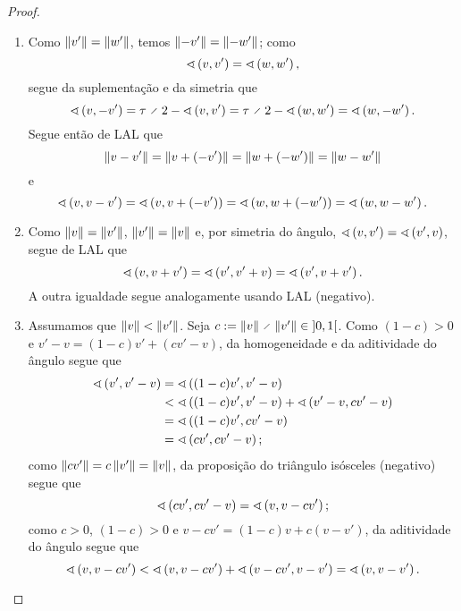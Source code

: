 \begin{proof}
	\begin{enumerate}
	\item Como $\nor{v'}=\nor{w'}$, temos $\nor{-v'}=\nor{-w'}$; como
		\begin{equation*}
		\ang{v}{v'} = \ang{w}{w'},
		\end{equation*}
	segue da suplementação e da simetria que
		\begin{equation*}
		\ang{v}{-v'} = \tau \div 2 - \ang{v}{v'} = \tau \div 2 - \ang{w}{w'} = \ang{w}{-w'}.
		\end{equation*}
	Segue então de LAL que
		\begin{equation*}
		\nor{v-v'} = \nor{v+(-v')} = \nor{w+(-w')} = \nor{w-w'}
		\end{equation*}
	e
		\begin{equation*}
		\ang{v}{v-v'} = \ang{v}{v+(-v')} = \ang{w}{w+(-w')} = \ang{w}{w-w'}.
		\end{equation*}

	\item Como $\nor{v}=\nor{v'}$, $\nor{v'}=\nor{v}$ e, por simetria do ângulo, $\ang{v}{v'} = \ang{v'}{v}$, segue de LAL que
		\begin{equation*}
			\ang{v}{v+v'} = \ang{v'}{v'+v} = \ang{v'}{v+v'}.
		\end{equation*}
	A outra igualdade segue analogamente usando LAL (negativo).

	\item Assumamos que $\nor{v} < \nor{v'}$. Seja $c := \nor{v} \div \nor{v'} \in \intaa{0}{1}$. Como $(1-c)>0$ e $v'-v = (1-c)v'+(cv'-v)$, da homogeneidade e da aditividade do ângulo segue que
		\begin{align*}
		\ang{v'}{v'-v}&= \ang{(1-c)v'}{v'-v} \\
			&< \ang{(1-c)v'}{v'-v} + \ang{v'-v}{cv'-v} \\
			&= \ang{(1-c)v'}{cv'-v} \\
			&= \ang{cv'}{cv'-v};
		\end{align*}
	como $\nor{cv'}=c\nor{v'}=\nor{v}$, da proposição do triângulo isósceles (negativo) segue que
		\begin{equation*}
		\ang{cv'}{cv'-v} = \ang{v}{v-cv'};
		\end{equation*}
	como $c>0$, $(1-c) > 0$ e $v-cv' = (1-c)v + c(v-v')$, da aditividade do ângulo segue que
		\begin{equation*}
		\ang{v}{v-cv'} < \ang{v}{v-cv'} + \ang{v-cv'}{v-v'} = \ang{v}{v-v'}.
		\end{equation*}


\end{enumerate}
\end{proof}
